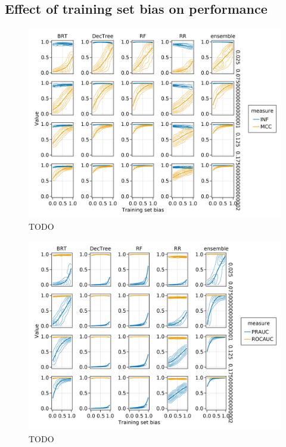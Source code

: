 \documentclass[11pt]{article}
\makeatletter
\def\maxwidth{\ifdim\Gin@nat@width>\linewidth\linewidth
\else\Gin@nat@width\fi}
\let\Oldincludegraphics\includegraphics
\renewcommand{\includegraphics}[1]{\Oldincludegraphics[width=\maxwidth]{#1}}
\makeatother
\begin{document}
\hypertarget{effect-of-training-set-bias-on-performance}{%
\subsection{Effect of training set bias on
performance}\label{effect-of-training-set-bias-on-performance}}

\begin{figure}
\hypertarget{fig:biasmccinf}{%
\centering
\includegraphics{figures/bias_mcc_inf.png}
\caption{TODO}\label{fig:biasmccinf}
}
\end{figure}

\begin{figure}
\hypertarget{fig:biasrocpr}{%
\centering
\includegraphics{figures/bias_roc_pr.png}
\caption{TODO}\label{fig:biasrocpr}
}
\end{figure}
\end{document}
